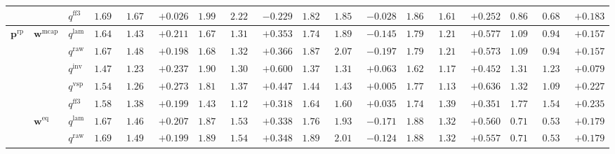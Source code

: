 \documentclass[eng]{kjas3}
\begin{document}
\begin{table}[t]
{\begin{tabular}{lll ccc ccc ccc ccc ccc}
 &  & $q^{\mathrm{ff3}}$ & $1.697$ & $1.671$ & \cellcolor{posgreen!50}$+0.026$ & $1.999$ & $2.228$ & \cellcolor{negred!50}$-0.229$ & $1.828$ & $1.856$ & \cellcolor{negred!50}$-0.028$ & $1.867$ & $1.615$ & \cellcolor{posgreen!50}$+0.252$ & $0.868$ & $0.685$ & \cellcolor{posgreen!50}$+0.183$ \\
\midrule
$\mathbf{p}^{\mathrm{rp}}$ & $\mathbf{w}^{\mathrm{mcap}}$ & $q^{\mathrm{lam}}$ & $1.644$ & $1.432$ & \cellcolor{posgreen!50}$+0.211$ & $1.672$ & $1.319$ & \cellcolor{posgreen!50}$+0.353$ & $1.746$ & $1.891$ & \cellcolor{negred!50}$-0.145$ & $1.794$ & $1.216$ & \cellcolor{posgreen!50}$+0.577$ & $1.099$ & $0.942$ & \cellcolor{posgreen!50}$+0.157$ \\
 &  & $q^{\mathrm{raw}}$ & $1.679$ & $1.481$ & \cellcolor{posgreen!50}$+0.198$ & $1.687$ & $1.321$ & \cellcolor{posgreen!50}$+0.366$ & $1.873$ & $2.070$ & \cellcolor{negred!50}$-0.197$ & $1.790$ & $1.218$ & \cellcolor{posgreen!50}$+0.573$ & $1.099$ & $0.942$ & \cellcolor{posgreen!50}$+0.157$ \\
 &  & $q^{\mathrm{inv}}$ & $1.476$ & $1.239$ & \cellcolor{posgreen!50}$+0.237$ & $1.906$ & $1.306$ & \cellcolor{posgreen!50}$+0.600$ & $1.377$ & $1.314$ & \cellcolor{posgreen!50}$+0.063$ & $1.629$ & $1.177$ & \cellcolor{posgreen!50}$+0.452$ & $1.312$ & $1.233$ & \cellcolor{posgreen!50}$+0.079$ \\
 &  & $q^{\mathrm{vsp}}$ & $1.540$ & $1.268$ & \cellcolor{posgreen!50}$+0.273$ & $1.818$ & $1.371$ & \cellcolor{posgreen!50}$+0.447$ & $1.441$ & $1.436$ & \cellcolor{posgreen!50}$+0.005$ & $1.771$ & $1.134$ & \cellcolor{posgreen!50}$+0.636$ & $1.320$ & $1.093$ & \cellcolor{posgreen!50}$+0.227$ \\
 &  & $q^{\mathrm{ff3}}$ & $1.586$ & $1.386$ & \cellcolor{posgreen!50}$+0.199$ & $1.438$ & $1.120$ & \cellcolor{posgreen!50}$+0.318$ & $1.643$ & $1.608$ & \cellcolor{posgreen!50}$+0.035$ & $1.749$ & $1.398$ & \cellcolor{posgreen!50}$+0.351$ & $1.779$ & $1.545$ & \cellcolor{posgreen!50}$+0.235$ \\
\cmidrule(lr){2-18}
 & $\mathbf{w}^{\mathrm{eq}}$ & $q^{\mathrm{lam}}$ & $1.672$ & $1.465$ & \cellcolor{posgreen!50}$+0.207$ & $1.876$ & $1.538$ & \cellcolor{posgreen!50}$+0.338$ & $1.764$ & $1.935$ & \cellcolor{negred!50}$-0.171$ & $1.883$ & $1.324$ & \cellcolor{posgreen!50}$+0.560$ & $0.715$ & $0.536$ & \cellcolor{posgreen!50}$+0.179$ \\
 &  & $q^{\mathrm{raw}}$ & $1.692$ & $1.493$ & \cellcolor{posgreen!50}$+0.199$ & $1.895$ & $1.547$ & \cellcolor{posgreen!50}$+0.348$ & $1.894$ & $2.019$ & \cellcolor{negred!50}$-0.124$ & $1.881$ & $1.324$ & \cellcolor{posgreen!50}$+0.557$ & $0.715$ & $0.536$ & \cellcolor{posgreen!50}$+0.179$ \\

\end{tabular}}
\end{table}
\end{document}
